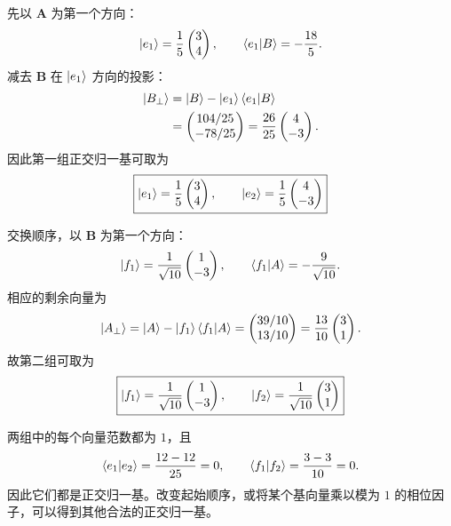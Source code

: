 \begin{checkedsolution}
先以 $\bm A$ 为第一个方向：
\[
  \left|e_1\right\rangle=\frac{1}{5}\begin{pmatrix}3\\4\end{pmatrix},
  \qquad
  \left\langle e_1 \middle| B \right\rangle=-\frac{18}{5}.
\]
减去 $\bm B$ 在 $\left|e_1\right\rangle$ 方向的投影：
\begin{align*}
  \left|B_\perp\right\rangle
  &=\left|B\right\rangle-\left|e_1\right\rangle\left\langle e_1 \middle| B \right\rangle\\
  &=\begin{pmatrix}104/25\\-78/25\end{pmatrix}
   =\frac{26}{25}\begin{pmatrix}4\\-3\end{pmatrix}.
\end{align*}
因此第一组正交归一基可取为
\[
  \boxed{
  \left|e_1\right\rangle=\frac{1}{5}\begin{pmatrix}3\\4\end{pmatrix},
  \qquad
  \left|e_2\right\rangle=\frac{1}{5}\begin{pmatrix}4\\-3\end{pmatrix}}
\]

交换顺序，以 $\bm B$ 为第一个方向：
\[
  \left|f_1\right\rangle=\frac{1}{\sqrt{10}}\begin{pmatrix}1\\-3\end{pmatrix},
  \qquad
  \left\langle f_1 \middle| A \right\rangle=-\frac{9}{\sqrt{10}}.
\]
相应的剩余向量为
\[
  \left|A_\perp\right\rangle
  =\left|A\right\rangle-\left|f_1\right\rangle\left\langle f_1 \middle| A \right\rangle
  =\begin{pmatrix}39/10\\13/10\end{pmatrix}
  =\frac{13}{10}\begin{pmatrix}3\\1\end{pmatrix}.
\]
故第二组可取为
\[
  \boxed{
  \left|f_1\right\rangle=\frac{1}{\sqrt{10}}\begin{pmatrix}1\\-3\end{pmatrix},
  \qquad
  \left|f_2\right\rangle=\frac{1}{\sqrt{10}}\begin{pmatrix}3\\1\end{pmatrix}}
\]

两组中的每个向量范数都为 $1$，且
\[
  \left\langle e_1 \middle| e_2 \right\rangle=\frac{12-12}{25}=0,
  \qquad
  \left\langle f_1 \middle| f_2 \right\rangle=\frac{3-3}{10}=0.
\]
因此它们都是正交归一基。改变起始顺序，或将某个基向量乘以模为 $1$ 的相位因子，可以得到其他合法的正交归一基。
\end{checkedsolution}

